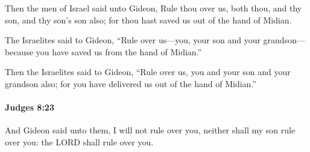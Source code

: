 			\begin{versebox}
					\item[BHS] 
					\item[ASV] Then the men of Israel said unto Gideon, Rule thou over us, both thou, and thy son, and thy son's son also; for thou hast saved us out of the hand of Midian.
					\item[NIV] The Israelites said to Gideon, “Rule over us—you, your son and your grandson—because you have saved us from the hand of Midian.”
					\item[NRSV] Then the Israelites said to Gideon, “Rule over us, you and your son and your grandson also; for you have delivered us out of the hand of Midian.”
			\end{versebox}

		\paragraph{Judges 8:23} %
			\label{JUDGES-8-23}

			And Gideon said unto them, I will not rule over you, neither shall my son rule over you: the LORD shall rule over you.

